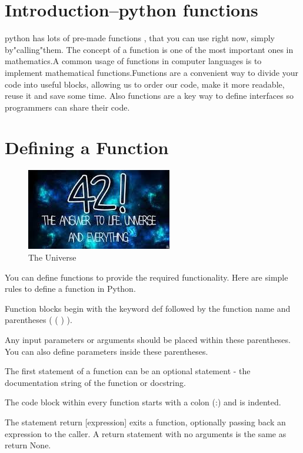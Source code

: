 \section{Introduction--python functions }
  python has lots of pre-made functions , that you can use right now, simply by"calling"them. The concept of a function is one of the most important ones in mathematics.A common usage of functions in computer languages is to implement mathematical functions.Functions are a convenient way to divide your code into useful blocks, allowing us to order our code, make it more readable, reuse it and save some time. Also functions are a key way to define interfaces so programmers can share their code.


\section{  Defining a Function}

\begin{figure}[h!]
\centering
\includegraphics[scale=0.5]{universe.jpg}
\caption{The Universe}
\label{fig:univerise}
\end{figure}




  
 

 You can define functions to provide the required functionality. Here are simple rules to define a function in Python.

Function blocks begin with the keyword def followed by the function name and parentheses ( ( ) ).

Any input parameters or arguments should be placed within these parentheses. You can also define parameters inside these parentheses.

The first statement of a function can be an optional statement - the documentation string of the function or docstring.

The code block within every function starts with a colon (:) and is indented.

The statement return [expression] exits a function, optionally passing back an expression to the caller. A return statement with no arguments is the same as return None.













